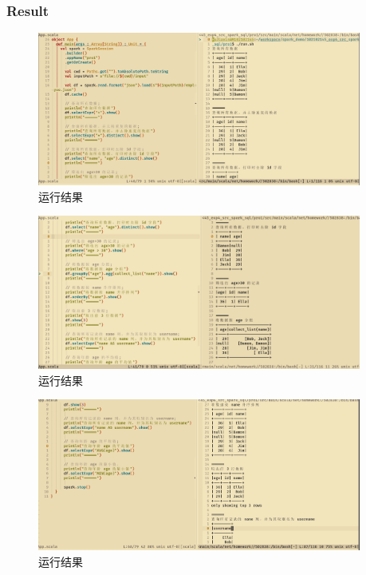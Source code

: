 \documentclass{article}
\begin{document}
\subsubsection{Result}
\begin{figure}[H]
  \begin{center}
    \includegraphics[width=0.95\textwidth]{./figures/1-0.png}
  \end{center}
  \caption{运行结果}
\end{figure}
\begin{figure}[H]
  \begin{center}
    \includegraphics[width=0.95\textwidth]{./figures/1-1.png}
  \end{center}
  \caption{运行结果}
\end{figure}
\begin{figure}[H]
  \begin{center}
    \includegraphics[width=0.95\textwidth]{./figures/1-2.png}
  \end{center}
  \caption{运行结果}
\end{figure}
\end{document}
